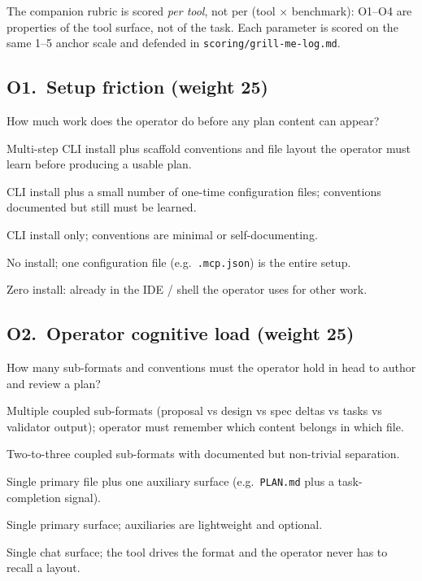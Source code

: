 The companion rubric is scored \emph{per tool}, not per (tool $\times$
benchmark): O1--O4 are properties of the tool surface, not of the
task. Each parameter is scored on the same 1--5 anchor scale and
defended in \texttt{scoring/grill-me-log.md}.

\subsection*{O1.\ Setup friction (weight 25)}
How much work does the operator do before any plan content can
appear?
\begin{description}[leftmargin=11mm, labelindent=0mm]
\item[1] Multi-step CLI install plus scaffold conventions and file
layout the operator must learn before producing a usable plan.
\item[2] CLI install plus a small number of one-time configuration
files; conventions documented but still must be learned.
\item[3] CLI install only; conventions are minimal or self-documenting.
\item[4] No install; one configuration file (e.g.\ \texttt{.mcp.json})
is the entire setup.
\item[5] Zero install: already in the IDE / shell the operator
uses for other work.
\end{description}

\subsection*{O2.\ Operator cognitive load (weight 25)}
How many sub-formats and conventions must the operator hold in head
to author and review a plan?
\begin{description}[leftmargin=11mm, labelindent=0mm]
\item[1] Multiple coupled sub-formats (proposal vs design vs spec
deltas vs tasks vs validator output); operator must remember which
content belongs in which file.
\item[2] Two-to-three coupled sub-formats with documented but
non-trivial separation.
\item[3] Single primary file plus one auxiliary surface (e.g.\
\texttt{PLAN.md} plus a task-completion signal).
\item[4] Single primary surface; auxiliaries are lightweight and
optional.
\item[5] Single chat surface; the tool drives the format and the
operator never has to recall a layout.
\end{description}

